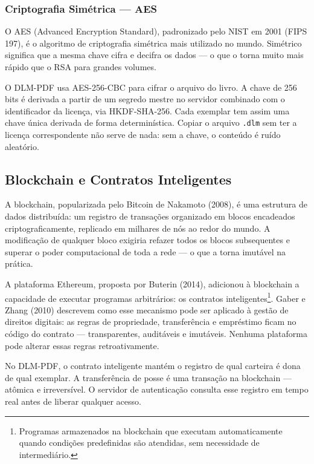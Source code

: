 \documentclass[12pt]{article}
\begin{document}
\subsubsection*{Criptografia Simétrica — AES}

O AES (Advanced Encryption Standard), padronizado pelo NIST em 2001 (FIPS 197), é o algoritmo de criptografia simétrica mais utilizado no mundo. Simétrico significa que a mesma chave cifra e decifra os dados — o que o torna muito mais rápido que o RSA para grandes volumes.

O DLM-PDF usa AES-256-CBC para cifrar o arquivo do livro. A chave de 256 bits é derivada a partir de um segredo mestre no servidor combinado com o identificador da licença, via HKDF-SHA-256. Cada exemplar tem assim uma chave única derivada de forma determinística. Copiar o arquivo \texttt{.dlm} sem ter a licença correspondente não serve de nada: sem a chave, o conteúdo é ruído aleatório.

\subsection{Blockchain e Contratos Inteligentes}

A blockchain, popularizada pelo Bitcoin de Nakamoto (2008), é uma estrutura de dados distribuída: um registro de transações organizado em blocos encadeados criptograficamente, replicado em milhares de nós ao redor do mundo. A modificação de qualquer bloco exigiria refazer todos os blocos subsequentes e superar o poder computacional de toda a rede — o que a torna imutável na prática.

A plataforma Ethereum, proposta por Buterin (2014), adicionou à blockchain a capacidade de executar programas arbitrários: os contratos inteligentes\footnote{Programas armazenados na blockchain que executam automaticamente quando condições predefinidas são atendidas, sem necessidade de intermediário.}. Gaber e Zhang (2010) descrevem como esse mecanismo pode ser aplicado à gestão de direitos digitais: as regras de propriedade, transferência e empréstimo ficam no código do contrato — transparentes, auditáveis e imutáveis. Nenhuma plataforma pode alterar essas regras retroativamente.

No DLM-PDF, o contrato inteligente mantém o registro de qual carteira é dona de qual exemplar. A transferência de posse é uma transação na blockchain — atômica e irreversível. O servidor de autenticação consulta esse registro em tempo real antes de liberar qualquer acesso.
\end{document}

